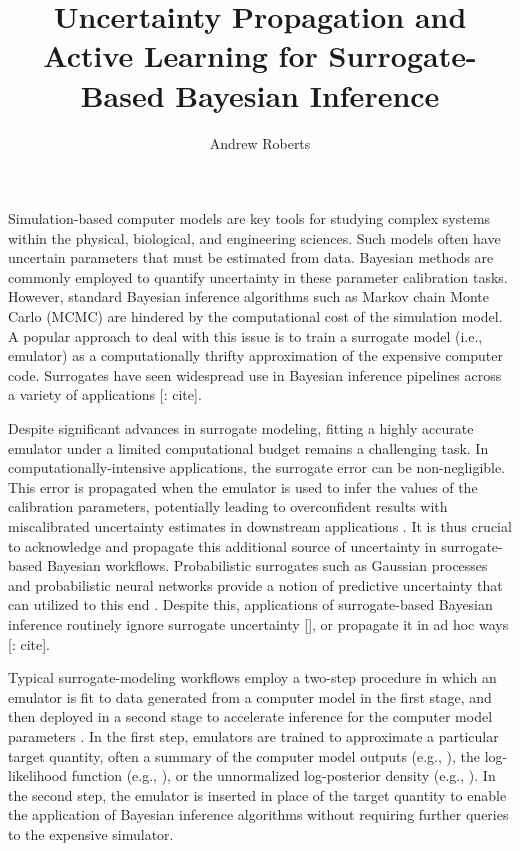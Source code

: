 \documentclass[12pt]{article}
\title{Uncertainty Propagation and Active Learning for Surrogate-Based Bayesian Inference}
\author{Andrew Roberts}
\begin{document}
\maketitle

Simulation-based computer models are key tools for studying complex systems within 
the physical, biological, and engineering sciences. 
Such models often have uncertain parameters that must be estimated from data. 
Bayesian methods are commonly employed
to quantify uncertainty in these parameter calibration tasks.
However, standard Bayesian inference algorithms such as Markov chain Monte Carlo (MCMC) 
are hindered by the computational cost of the simulation model.
A popular approach to deal with this issue is to train a surrogate model 
(i.e., emulator) as a computationally thrifty approximation of the expensive computer code.
Surrogates have seen widespread use in Bayesian inference pipelines across a variety 
of applications [\todo: cite]. 

Despite significant advances in surrogate modeling, fitting a 
highly accurate emulator under a limited computational budget remains a challenging task.
In computationally-intensive applications, the surrogate error can be non-negligible. 
This error is propagated when the emulator is used to infer the values of the calibration 
parameters, potentially leading to overconfident results with miscalibrated uncertainty 
estimates in downstream applications \citep{BurknerSurrogate}.
It is thus crucial to acknowledge and propagate this 
additional source of uncertainty in surrogate-based Bayesian workflows.
Probabilistic surrogates such as Gaussian processes \citep{gpML,gramacy2020surrogates} 
and probabilistic neural networks \citep{deepEnsembles,BayesOptNN} provide a notion of 
predictive uncertainty that can utilized to this end
 \citep{reviewPaper,BilionisBayesSurrogates,BurknerSurrogate,CES,FerEmulation}.
 Despite this, applications of surrogate-based Bayesian inference routinely ignore 
 surrogate uncertainty [\todo], or propagate it in ad hoc ways [\todo: cite].
 
Typical surrogate-modeling workflows employ a two-step procedure
in which an emulator is fit to data generated from a computer model in the first stage, 
and then deployed in a second stage to accelerate inference for the computer 
model parameters \citep{modularization,BurknerTwoStep,BurknerSurrogate}. 
In the first step, emulators are trained to approximate a particular target quantity, 
often a summary of the computer model outputs 
(e.g., \citet{hydrologicalModel,idealizedGCM,Surer2023sequential}), the log-likelihood
function (e.g., \citet{VehtariParallelGP,FATES_CES,trainDynamics}), or the unnormalized 
log-posterior density (e.g., \citet{emPostDens,gp_surrogates_random_exploration,Kandasamy_2017}).
In the second step, the emulator 
is inserted in place of the target quantity to enable the application of Bayesian inference  
algorithms without requiring further queries to the expensive simulator.
\end{document}
